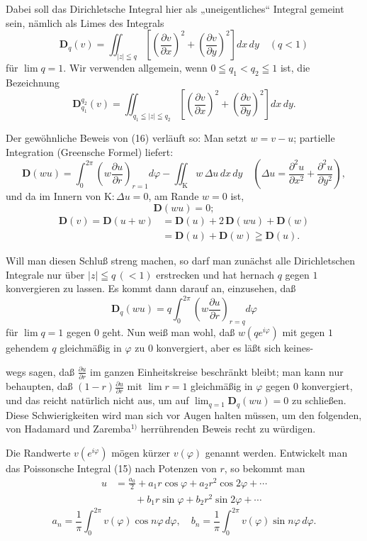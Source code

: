 \documentclass{article}
\begin{document}
Dabei soll das Dirichletsche Integral hier als „uneigentliches“ Integral gemeint sein, nämlich als Limes des Integrals
\[ \mathbf{D}_q(v) = \iint_{|z| \leqq q} \left[ \left(\frac{\partial v}{\partial x}\right)^2 + \left(\frac{\partial v}{\partial y}\right)^2 \right] dx\,dy \quad (q < 1) \]
für $\lim q = 1$. Wir verwenden allgemein, wenn $0 \leqq q_1 < q_2 \leqq 1$ ist, die Bezeichnung
\[ \mathbf{D}_{q_1}^{q_2}(v) = \iint_{q_1 \leqq |z| \leqq q_2} \left[ \left(\frac{\partial v}{\partial x}\right)^2 + \left(\frac{\partial v}{\partial y}\right)^2 \right] dx\,dy. \]

Der gewöhnliche Beweis von (16) verläuft so: Man setzt $w = v - u$; partielle Integration (Greensche Formel) liefert:
\[ \mathbf{D}(wu) = \int_0^{2\pi} \left( w \frac{\partial u}{\partial r} \right)_{r=1} d\varphi - \iint_{\mathrm{K}} w\,\Delta u\,dx\,dy \quad \left( \Delta u = \frac{\partial^2 u}{\partial x^2} + \frac{\partial^2 u}{\partial y^2} \right), \]
und da im Innern von $\mathrm{K}\colon \Delta u = 0$, am Rande $w = 0$ ist,
\[ \mathbf{D}(wu) = 0; \]
\[ \begin{aligned}
\mathbf{D}(v) = \mathbf{D}(u + w) &= \mathbf{D}(u) + 2\,\mathbf{D}(wu) + \mathbf{D}(w) \\
&= \mathbf{D}(u) + \mathbf{D}(w) \geqq \mathbf{D}(u).
\end{aligned} \]

Will man diesen Schluß streng machen, so darf man zunächst alle Dirichletschen Integrale nur über $|z| \leqq q\,(< 1)$ erstrecken und hat hernach $q$ gegen $1$ konvergieren zu lassen. Es kommt dann darauf an, einzusehen, daß
\[ \mathbf{D}_q(wu) = q \int_0^{2\pi} \left( w \frac{\partial u}{\partial r} \right)_{r=q} d\varphi \]
für $\lim q = 1$ gegen $0$ geht. Nun weiß man wohl, daß $w(q e^{i\varphi})$ mit gegen $1$ gehendem $q$ gleichmäßig in $\varphi$ zu $0$ konvergiert, aber es läßt sich keines-

wegs sagen, daß $\frac{\partial u}{\partial r}$ im ganzen Einheitskreise beschränkt bleibt; man kann nur behaupten, daß $(1 - r) \frac{\partial u}{\partial r}$ mit $\lim r = 1$ gleichmäßig in $\varphi$ gegen $0$ konvergiert, und das reicht natürlich nicht aus, um auf $\lim_{q=1} \mathbf{D}_q(wu) = 0$ zu schließen. Diese Schwierigkeiten wird man sich vor Augen halten müssen, um den folgenden, von Hadamard und Zaremba${}^{1)}$ herrührenden Beweis recht zu würdigen.

Die Randwerte $v(e^{i\varphi})$ mögen kürzer $v(\varphi)$ genannt werden. Entwickelt man das Poissonsche Integral (15) nach Potenzen von $r$, so bekommt man
\[ \begin{aligned}
u &= \frac{a_0}{2} + a_1 r \cos\varphi + a_2 r^2 \cos 2\varphi + \cdots \\
&\qquad + b_1 r \sin\varphi + b_2 r^2 \sin 2\varphi + \cdots
\end{aligned} \]
\[ a_n = \frac{1}{\pi} \int_0^{2\pi} v(\varphi) \cos n\varphi\,d\varphi, \quad b_n = \frac{1}{\pi} \int_0^{2\pi} v(\varphi) \sin n\varphi\,d\varphi. \]
\end{document}
